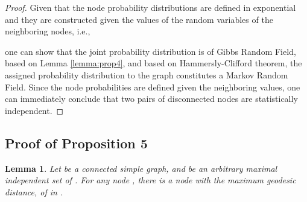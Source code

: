 \documentclass{article}
\newtheorem{lemma}{Lemma}
\begin{document}
\begin{proof}
	Given that the node probability distributions are defined in exponential and they are constructed given the values of the random variables of the neighboring nodes, i.e., 
	
	one can show that the joint probability distribution is of Gibbs Random Field, based on Lemma \ref{lemma:prop4}, and based on Hammersly-Clifford theorem, the assigned probability distribution to the graph constitutes a Markov Random Field. Since the node probabilities are defined given the neighboring values, one can immediately conclude that two pairs of disconnected nodes are statistically independent.
\end{proof}

\subsection{Proof of Proposition 5}
\begin{lemma}\label{lem:1}
	Let  be a connected simple graph, and  be an arbitrary maximal independent set of . For any node , there is a node  with the maximum geodesic distance,  of  in .
\end{lemma}
\end{document}
